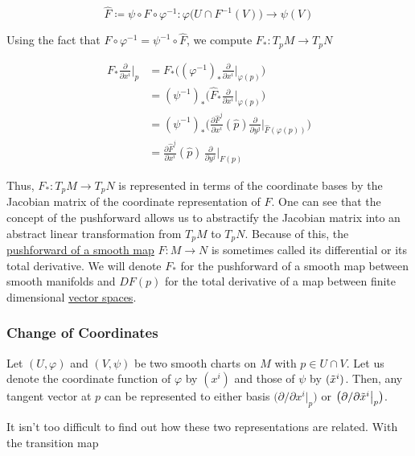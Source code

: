 \documentclass{article}
\begin{document}
      \begin{equation}
        \hat{F} \coloneqq \psi \circ F \circ \varphi^{-1}: \varphi \big( U \cap F^{-1} (V) \big) \to \psi (V)
      \end{equation}

    Using the fact that $F \circ \varphi^{-1} = \psi^{-1} \circ \hat{F}$, we compute $F_*: T_p M \to T_p N$

    \begin{align*}
      F_* \frac{\partial}{\partial x^i} \bigg|_p & = F_* \bigg( ( \varphi^{-1} )_* \frac{\partial}{\partial x^i} \bigg|_{\varphi(p)} \bigg) \\
      & = (\psi^{-1})_* \bigg( \hat{F}_* \frac{\partial}{\partial x^i} \bigg|_{\varphi(p)}\bigg) \\ 
      & = (\psi^{-1})_* \bigg( \frac{\partial \hat{F}^j}{\partial x^i} (\hat{p}) \frac{\partial}{\partial y^j} \bigg|_{\hat{F}(\varphi(p))} \bigg) \\
      & = \frac{\partial \hat{F}^j}{\partial x^i} (\hat{p})\, \frac{\partial}{\partial y^j} \bigg|_{F(p)} 
    \end{align*}

    Thus, $F_*: T_p M \to T_p N$ is represented in terms of the coordinate bases by the Jacobian matrix of the coordinate representation of $F$. One can see that the concept of the pushforward allows us to abstractify the Jacobian matrix into an abstract linear transformation from $T_p M$ to $T_p N$. Because of this, the \hyperref[def:pushforward-of-a-smooth-map]{pushforward of a smooth map} $F: M \to N$ is sometimes called its differential or its total derivative. We will denote $F_*$ for the pushforward of a smooth map between smooth manifolds and $DF(p)$ for the total derivative of a map between finite dimensional \hyperref[lin-def:vector-space]{vector spaces}. 

    \subsubsection{Change of Coordinates}

      Let $(U, \varphi)$ and $(V, \psi)$ be two smooth charts on $M$ with $p \in U \cap V$. Let us denote the coordinate function of $\varphi$ by $(x^i)$ and those of $\psi$ by $( \Tilde{x}^i)$. Then, any tangent vector at $p$ can be represented to either basis $ \big( \partial/\partial x^i \big|_p \big)$ or $\big( \partial/\partial \Tilde{x}^i \big|_p \big)$. 

      It isn't too difficult to find out how these two representations are related. With the transition map 
\end{document}
